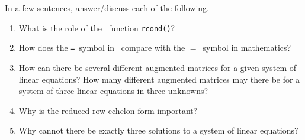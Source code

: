 \begin{exercise}  
In a few sentences, answer\slash discuss each of the following.
\begin{enumerate}
\item What is the role of the \script\ function \verb|rcond()|?

\item How does the \verb|=|~symbol in \script\ compare with the \(=\)~symbol in mathematics?

\item How can there be several different augmented matrices for a given system of linear equations?  How many different augmented matrices may there be for a system of three linear equations in three unknowns?

\item Why is the reduced row echelon form important?

\item Why cannot there be exactly three solutions to a system of linear equations?

\end{enumerate}
\end{exercise}

\begin{comment}%
why, what caused X?
how did X occur?
what-if? what-if-not?
how does X compare with Y?
what is the evidence for X?
why is X important?
\end{comment}


